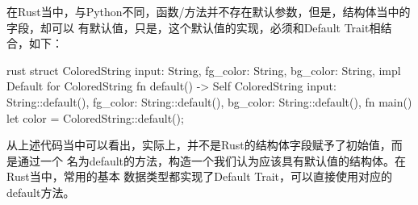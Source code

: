 在Rust当中，与Python不同，函数/方法并不存在默认参数，但是，结构体当中的字段，却可以
有默认值，只是，这个默认值的实现，必须和Default Trait相结合，如下：
\begin{code-block}{rust}
struct ColoredString {
    input: String,
    fg_color: String,
    bg_color: String,
}
impl Default for ColoredString {
    fn default() -> Self {
        ColoredString {
            input: String::default(),
            fg_color: String::default(),
            bg_color: String::default(),
        }
    }
}
fn main() {
    let color = ColoredString::default();
}
\end{code-block}
从上述代码当中可以看出，实际上，并不是Rust的结构体字段赋予了初始值，而是通过一个
名为default的方法，构造一个我们认为应该具有默认值的结构体。在Rust当中，常用的基本
数据类型都实现了Default Trait，可以直接使用对应的default方法。

